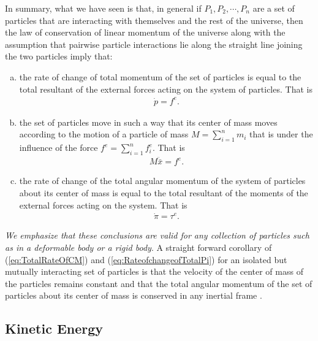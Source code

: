 \documentclass[graybox,envcountchap,sectrefs]{svmonoMuga}
\begin{document}
\begin{svgraybox}
In summary, what we have seen is that, in general if $P_1,P_2,\cdots,P_n$ are a set of particles that are interacting with themselves and the rest of the universe, then the law of conservation of linear momentum of the universe along with the assumption that pairwise particle interactions lie along the straight line joining the two particles imply that:
\begin{enumerate}[(a)]
\item the rate of change of total momentum of the set of particles is equal to the total resultant of the external forces acting on the system of particles. That is
\begin{align}
\dot{p}=f^e.\label{eq:TotalRateOfP}
\end{align}
\item the set of particles move in such a way that its center of mass moves according to the motion of a particle of mass $M=\sum_{i=1}^nm_i$ that is under the influence of the force $f^e=\sum_{i=1}^nf_i^e$. That is
\begin{align}
M\ddot{\bar{x}}=f^e.\label{eq:TotalRateOfCM}
\end{align}
\item the rate of change of the total angular momentum of the system of particles about its center of mass is equal to the total resultant of the moments of the external forces acting on the system. That is
\begin{align}
\dot{\pi}=\tau^e. \label{eq:RateofchangeofTotalPi}
\end{align}
\end{enumerate}
\end{svgraybox}



\emph{We emphasize that these conclusions are valid for any collection of particles such as in a deformable body or a rigid body}. A straight forward corollary of (\ref{eq:TotalRateOfCM}) and  (\ref{eq:RateofchangeofTotalPi}) for an isolated but mutually interacting set of particles is that the velocity of the center of mass of the particles remains constant and that the total angular momentum of the set of particles about its center of mass is conserved  in any inertial frame . 






\subsection{Kinetic Energy}
\end{document}
